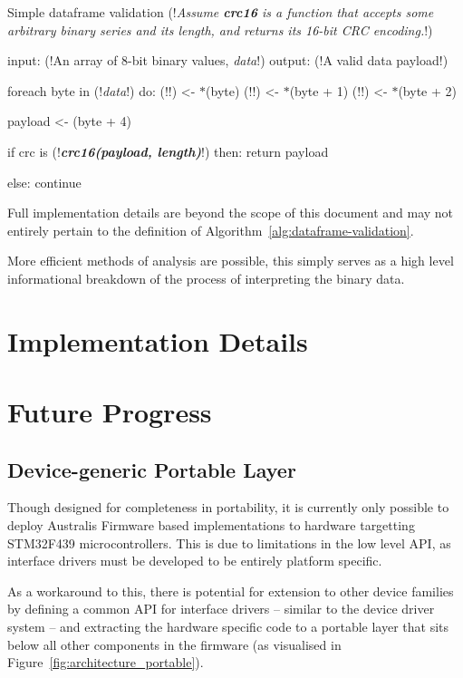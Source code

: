 
\begin{algorithm}{Simple dataframe validation}
(!\textit{Assume \emph{\bfseries crc16} is a function that accepts some arbitrary binary series and its length, and returns its 16-bit CRC encoding.}!)

input:  (!An array of 8-bit binary values, \emph{data}!) 
output: (!A valid data payload!)

foreach byte in (!\emph{data}!) do:
    (!!) <- $\ast$(byte)
    (!!) <- $\ast$(byte + 1)
    (!!) <- $\ast$(byte + 2)

    payload <- (byte + 4)

    if crc is (!\emph{\bfseries crc16(payload, length)}!) then:
        return payload

    else: continue
\end{algorithm}

Full implementation details are beyond the scope of this document and may not entirely pertain to the definition of Algorithm~\ref{alg:dataframe-validation}. 

More efficient methods of analysis are possible, this simply serves as a high level informational breakdown of the process of interpreting the binary data.

\section{Implementation Details}

\section{Future Progress}

\subsection{Device-generic Portable Layer}
Though designed for completeness in portability, it is currently only possible to deploy Australis Firmware based implementations to hardware targetting STM32F439 microcontrollers. This is due to limitations in the low level API, as interface drivers must be developed to be entirely platform specific. 

As a workaround to this, there is potential for extension to other device families by defining a common API for interface drivers -- similar to the device driver system -- and extracting the hardware specific code to a portable layer that sits below all other components in the firmware (as visualised in Figure~\ref{fig:architecture_portable}). 


